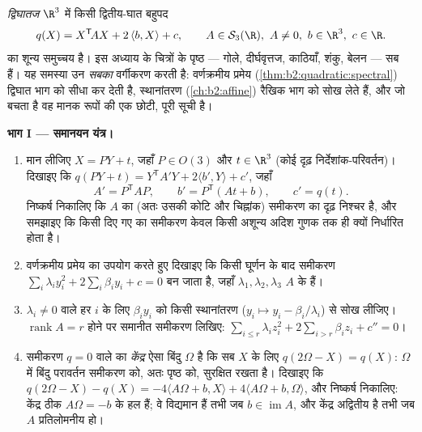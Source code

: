 \begin{problem}[{सप्ताहांत समस्या --- हर द्विघातज पृष्ठ,
वर्णक्रमीय प्रमेय से छाँटा हुआ}]\label{pb:b2:surfaces:1}
\emph{द्विघातज} $\R^3$ में किसी द्वितीय-घात बहुपद
\[
q(X) = X^{\mathsf T}\!AX + 2\,\langle b, X\rangle + c,
\qquad A \in \mathcal S_3(\R),\ A \neq 0,\ b \in \R^3,\
c \in \R .
\]
का शून्य समुच्चय है। इस अध्याय के चित्रों के पृष्ठ --- गोले,
दीर्घवृत्तज, काठियाँ, शंकु, बेलन --- सब  हैं। यह समस्या
उन \emph{सबका} वर्गीकरण करती है: वर्णक्रमीय प्रमेय
(\cref{thm:b2:quadratic:spectral}) द्विघात भाग को सीधा कर देती है,  स्थानांतरण
(\cref{ch:b2:affine}) रैखिक भाग को सोख लेते हैं, और जो बचता है वह मानक रूपों
की एक छोटी, पूरी सूची है।

\medskip
\noindent\textbf{भाग I --- समानयन यंत्र।}
\begin{enumerate}
  \item मान लीजिए $X = PY + t$, जहाँ $P \in O(3)$ और $t \in \R^3$ (कोई दृढ़
        निर्देशांक-परिवर्तन)। दिखाइए कि $q(PY + t) =
        Y^{\mathsf T}\!A'Y + 2\langle b', Y\rangle + c'$, जहाँ
        \[
        A' = P^{\mathsf T}\!AP, \qquad
        b' = P^{\mathsf T}(At + b), \qquad
        c' = q(t) .
        \]
        निष्कर्ष निकालिए कि $A$ का  (अतः उसकी कोटि
        और चिह्नांक) समीकरण का दृढ़ निश्चर है, और समझाइए कि
        किसी दिए गए  का समीकरण केवल किसी अशून्य अदिश
        गुणक तक ही क्यों निर्धारित होता है।
  \item वर्णक्रमीय प्रमेय का उपयोग करते हुए दिखाइए कि किसी
        घूर्णन के बाद समीकरण $\sum_i \lambda_i y_i^2 +
        2\sum_i\beta_iy_i + c = 0$ बन जाता है, जहाँ $\lambda_1, \lambda_2,
        \lambda_3$
        $A$ के  हैं।
  \item $\lambda_i \neq 0$ वाले हर $i$ के लिए $\beta_iy_i$ को किसी स्थानांतरण
        ($y_i \mapsto y_i -
        \beta_i/\lambda_i$) से सोख लीजिए। $\operatorname{rank} A = r$ होने पर समानीत समीकरण
        लिखिए: $\sum_{i\leq r}\lambda_i
        z_i^2 + 2\sum_{i > r}\beta_iz_i + c'' = 0$।
  \item समीकरण $q = 0$ वाले  का \emph{केंद्र} ऐसा बिंदु
        $\Omega$ है कि सब $X$ के लिए $q(2\Omega - X) = q(X)$: $\Omega$ में बिंदु
        परावर्तन समीकरण को, अतः पृष्ठ को, सुरक्षित रखता है।
        दिखाइए कि $q(2\Omega - X)
        - q(X) = -4\langle A\Omega + b, X\rangle + 4\langle
        A\Omega + b, \Omega\rangle$, और निष्कर्ष निकालिए: केंद्र ठीक
        $A\Omega = -b$ के हल हैं; वे विद्यमान हैं तभी जब $b \in \operatorname{im}A$, और
        केंद्र अद्वितीय है तभी जब $A$ प्रतिलोमनीय हो।
\end{enumerate}


\end{problem}
